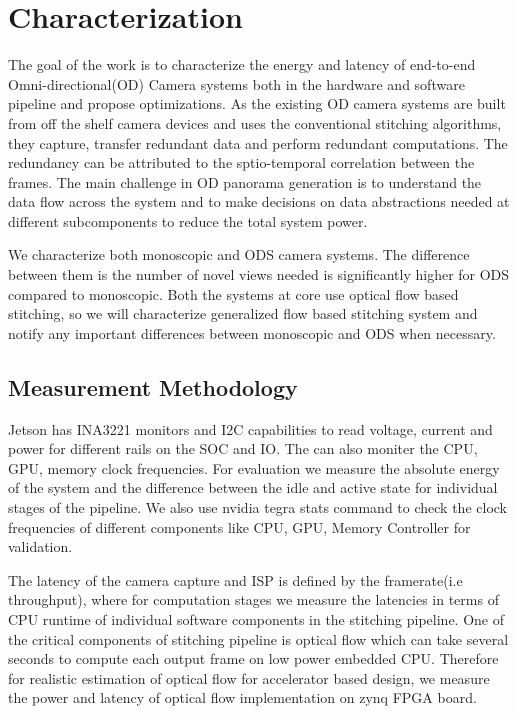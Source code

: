 \chapter{Characterization}

The goal of the work is to characterize the energy and latency of end-to-end Omni-directional(OD) Camera  systems both in the hardware and software pipeline and propose optimizations. As the existing OD camera systems are built from off the shelf camera devices and uses the conventional stitching algorithms, they capture, transfer redundant data and perform redundant computations. The redundancy can be attributed to the sptio-temporal correlation between the frames. The main challenge in OD panorama generation is to understand the data flow across the system and to make decisions on data abstractions needed at different subcomponents to reduce the total system power.

We characterize both monoscopic and ODS camera systems. The difference between them is the number of novel views needed is significantly higher for ODS compared to monoscopic. Both the systems at core use optical flow based stitching, so we will characterize generalized flow based stitching system and notify any important differences between monoscopic and ODS when necessary.\newline


\section{Measurement Methodology} %
Jetson has INA3221 monitors and I2C capabilities to read voltage, current and power for different rails on the SOC and IO. The can also moniter the CPU, GPU, memory clock frequencies. For evaluation we measure the absolute energy of the system and the difference between the idle and active state for individual stages of the pipeline. We also use nvidia tegra stats command to check the clock frequencies of different components like CPU, GPU, Memory Controller for validation. 

The latency of the camera capture and ISP is defined by the framerate(i.e throughput), where for computation stages we measure the latencies in terms of CPU runtime of individual software components in the stitching pipeline. One of the critical components of stitching pipeline is optical flow which can take several seconds to compute each output frame on low power embedded CPU. Therefore for realistic estimation of optical flow for accelerator based design, we measure the power and latency of optical flow implementation on zynq FPGA board. 


